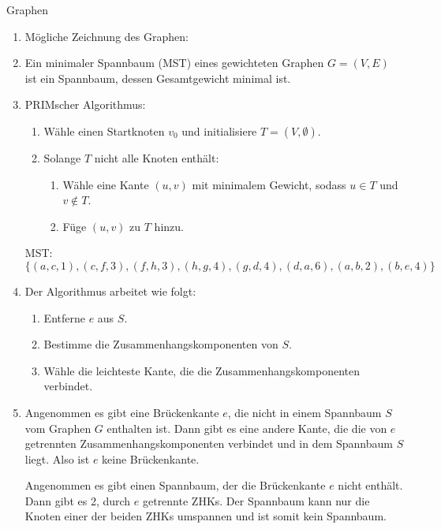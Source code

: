 \documentclass{article}
\begin{document}
\begin{exercise}{Graphen}
  \begin{solution}
    \begin{enumerate}
      \item Mögliche Zeichnung des Graphen:
      \item Ein minimaler Spannbaum (MST) eines gewichteten Graphen $G = (V, E)$ ist ein Spannbaum, dessen Gesamtgewicht minimal ist.
      \item PRIMscher Algorithmus:
            \begin{enumerate}
              \item Wähle einen Startknoten $v_0$ und initialisiere $T = (V, \emptyset)$.
              \item Solange $T$ nicht alle Knoten enthält:
                    \begin{enumerate}
                      \item Wähle eine Kante $(u, v)$ mit minimalem Gewicht, sodass $u \in T$ und $v \notin T$.
                      \item Füge $(u, v)$ zu $T$ hinzu.
                    \end{enumerate}
            \end{enumerate}
            MST: $\{(a, c, 1), (c, f, 3), (f, h, 3), (h, g, 4), (g, d, 4), (d, a, 6), (a, b, 2), (b, e, 4)\}$
      \item Der Algorithmus arbeitet wie folgt:
            \begin{enumerate}
              \item Entferne $e$ aus $S$.
              \item Bestimme die Zusammenhangskomponenten von $S$.
              \item Wähle die leichteste Kante, die die Zusammenhangskomponenten verbindet.
            \end{enumerate}
      \item Angenommen es gibt eine Brückenkante $e$, die nicht in einem Spannbaum $S$ vom Graphen $G$ enthalten ist. Dann gibt es eine andere Kante, die die von $e$ getrennten Zusammenhangskomponenten verbindet und in dem Spannbaum $S$ liegt. Also ist $e$ keine Brückenkante.\par
            Angenommen es gibt einen Spannbaum, der die Brückenkante $e$ nicht enthält. Dann gibt es 2, durch $e$ getrennte ZHKs. Der Spannbaum kann nur die Knoten einer der beiden ZHKs umspannen und ist somit kein Spannbaum.
    \end{enumerate}
  \end{solution}
\end{exercise}
\end{document}
